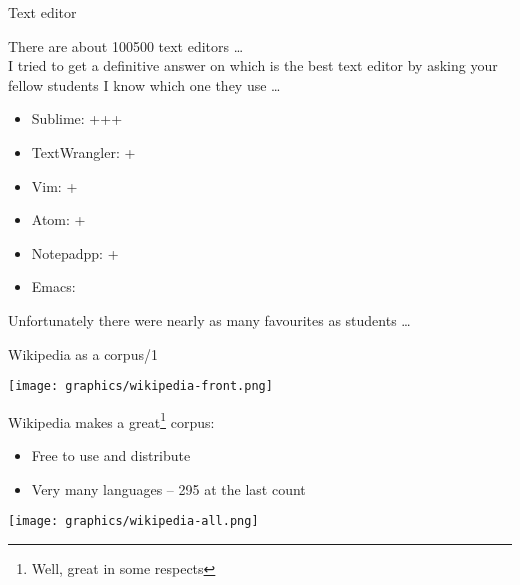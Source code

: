 \documentclass[10pt, compress]{beamer}
\begin{document}
\begin{frame}{Text editor}

There are about 100500 text editors \ldots
~\\

I tried to get a definitive answer on which is the best text editor by asking
your fellow students I know which one they use \ldots

\begin{itemize}
\item Sublime: +++
\item TextWrangler: +
\item Vim: +
\item Atom: +
\item Notepadpp: +
\item Emacs:
\end{itemize}

Unfortunately there were nearly as many favourites as students \ldots


\end{frame}


\begin{frame}{Wikipedia as a corpus/1}

\begin{center}
\texttt{[image: graphics/wikipedia-front.png]}
\end{center}

Wikipedia makes a great\footnote{Well, great in some respects} corpus:

\begin{itemize}
   \item Free to use and distribute
   \item Very many languages -- 295 at the last count
\end{itemize}

\end{frame}

\begin{frame}
\begin{center}
\texttt{[image: graphics/wikipedia-all.png]}
\end{center}
\end{frame}
\end{document}
